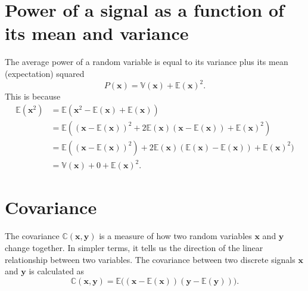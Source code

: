 \section{Power of a signal as a function of its mean and variance}
The average power of a random variable is equal to its variance plus its mean
(expectation) squared
\begin{equation}
  P(\mathbf{x}) =  \mathbb{V}(\mathbf{x}) + \mathbb{E}(\mathbf{x})^2.
  \label{eq:power_mean_variance}
\end{equation}
This is because
\begin{align*}
  \mathbb{E}(\mathbf{x}^2)
  & = \mathbb{E}(\mathbf{x}^2 - \mathbb{E}(\mathbf{x}) + \mathbb{E}(\mathbf{x})) \\
  & = \mathbb{E}((\mathbf{x} - \mathbb{E}(\mathbf{x}))^2 + 2\mathbb{E}(\mathbf{x})(\mathbf{x}-\mathbb{E}(\mathbf{x})) + \mathbb{E}(\mathbf{x})^2) \\
  & = \mathbb{E}((\mathbf{x}-\mathbb{E}(\mathbf{x}))^2) + 2\mathbb{E}(\mathbf{x})(\mathbb{E}(\mathbf{x})-\mathbb{E}(\mathbf{x})) + \mathbb{E}(\mathbf{x})^2) \\
  & = \mathbb{V}(\mathbf{x}) + 0 + \mathbb{E}(\mathbf{x})^2.
\end{align*}

\section{Covariance}
\label{sec:covariance}

The covariance $\mathbb{C}(\mathbf{x}, \mathbf{y})$ is a measure of
how two random variables $\mathbf{x}$ and $\mathbf{y}$ change
together. In simpler terms, it tells us the direction of the linear
relationship between two variables. The covariance between two
discrete signals $\mathbf{x}$ and $\mathbf{y}$ is calculated as
\begin{equation}
  \mathbb{C}(\textbf{x}, \textbf{y}) = \mathbb{E}\big((\mathbf{x}-\mathbb{E}(\mathbf{x}))(\mathbf{y}-\mathbb{E}(\mathbf{y}))\big).
\end{equation}

